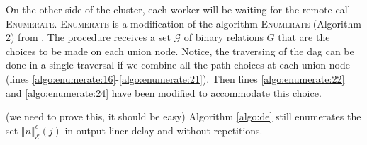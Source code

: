 \documentclass[12pt, a4paper]{article}
\begin{document}
On the other side of the cluster, each worker will be waiting for the remote call \textsc{Enumerate}. \textsc{Enumerate} is a modification of the algorithm \textsc{Enumerate} (Algorithm 2) from \cite{core}. The procedure receives a set $\mathcal{G}$ of binary relations $G$ that are the choices to be made on each union node. Notice, the traversing of the \gls{dag} can be done in a single traversal if we combine all the path choices at each union node (lines \ref{algo:enumerate:16}-\ref{algo:enumerate:21}). Then lines \ref{algo:enumerate:22} and \ref{algo:enumerate:24} have been modified to accommodate this choice.

(we need to prove this, it should be easy) Algorithm \ref{algo:de} still enumerates the set ${\llbracket n \rrbracket}^{\epsilon}_{\mathcal{E}}(j)$ in output-liner delay and without repetitions.




%
\end{document}

